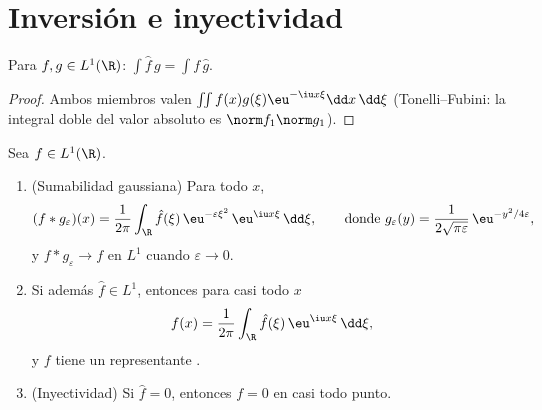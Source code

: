 \section{Inversión e inyectividad}

\begin{lemma}
\label{lem:b3:fouriertransform:multiplication}
Para $f, g \in L^1(\R)$: $\displaystyle\int \hat f\,g =
\int f\,\hat g$.
\end{lemma}

\begin{proof}
Ambos miembros valen $\iint f(x)g(\xi)\eu^{-\iu x\xi}\dd
x\,\dd\xi$ (Tonelli--Fubini: la integral doble del valor absoluto es
$\norm f_1\norm g_1$).
\end{proof}

\begin{theorem}[Inversión]\label{thm:b3:fouriertransform:inversion}
Sea $f \in L^1(\R)$.
\begin{enumerate}
  \item (Sumabilidad gaussiana) Para todo $x$,
        \[
        (f * g_\varepsilon)(x) =
        \frac1{2\pi}\int_\R \hat f(\xi)\,
        \eu^{-\varepsilon\xi^2}\,\eu^{\iu x\xi}\,\dd\xi,
        \qquad\text{donde } g_\varepsilon(y) =
        \frac{1}{2\sqrt{\pi\varepsilon}}\,
        \eu^{-y^2/4\varepsilon},
        \]
        y $f * g_\varepsilon \to f$ en $L^1$ cuando $\varepsilon
        \to 0$. \item Si además $\hat f \in L^1$, entonces para casi
        todo
        $x$
        \[
        f(x) = \frac{1}{2\pi}\int_\R \hat
        f(\xi)\,\eu^{\iu x\xi}\,\dd\xi ,
        \]
        y $f$ tiene un representante
        . \item
        (Inyectividad) Si $\hat f = 0$, entonces $f = 0$ en casi todo
        punto.
\end{enumerate}
\end{theorem}

